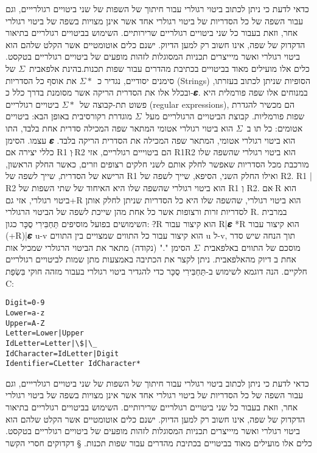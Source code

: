 {כדאי לדעת כי ניתן לכתוב ביטוי רגולרי עבור חיתוך של השפות של שני ביטויים
רגולרייים, וגם עבור השפה של כל הסדריות של ביטוי רגולרי אחד אשר אינן מצויות בשפה
של ביטוי רגולרי אחר, וזאת בעבור כל שני ביטויים רגולריים שרירותיים. השימוש
בביטויים רגולריים בתיאור הדקדוק של שפה, אינו חשוב רק למען הדיוק. ישנם כלים
אוטומטיים אשר הקלט שלהם הוא ביטוי רגולרי ואשר מיייצרים תכניות המסוגלות לזהות
מופעים של ביטויים רגולריים בטקסט. כלים אלו מועילים מאוד בביטויים בכתיבת מהדרים
עבור שפות תכנות.בהינת אלפאבית~$Σ$ של סימנים יסודיים, נגדיר כ~$Σ*$ את אוסף כל הסדריות (Strings) הסופיות שניתן לכתוב בעזרתו, ובכלל אלו את הסדרית הריקה אשר מסומנת בדרך כלל כ-𝜺. במנוחים אלו שפה פורמלית היא פשוט תת-קבוצה של~$Σ*$ ביטויים רגולריים (regular expressions), הם מכשיר להגדרת שפות פורמליות.
קבוצת הביטויים הרגולריים מעל~$Σ$ מוגדרת רקורסיבית באופן הבא:
ביטויים אטומים:
כל תו ב~$Σ$ הוא ביטוי רגולרי אטומי המתאר שפה המכילה סדרית אחת בלבד, התו עצמו.
הסימן 𝜺 הוא ביטוי רגולרי אטומי, המתאר שפה המכילה את הסדרית הריקה בלבד.
כללי יצירה
אם R1 וְ ּR2 הם ביטוייים רגולריים, אזי
R1R2 הוא ביטוי רגולרי שהשפה שלו מורכבת מכל הסדריות שאפשר לחלק אותם לשני חלקים
רצופים וזרים, כאשר החלק הראשון, הרישא של הסדרית, שייך לשפה של R1 ואילו החלק
השני, הסיפא, שייך לשפה של R2. R1 | R2 הוא ביטוי רגולרי שהשפה שלו היא האיחוד של
שתי השפות של R1 וְ R2. אם ּR הוא ביטוי רגולרי, אזי גם+R הוא ביטוי רגולרי, שהשפה
שלו היא כל הסדריות שניתן לחלק אותן לסדריות זרות ורצופות אשר כל אחת מהן שייכת
לשפה של הביטוי הרגולרי R.
במרבית השימושים בפועל מוסיפים תַּחְבִּירִי סֻכָּר כגון:
?ּR הוא קיצור עבור R|𝜺 *R הוא קיצור עבור (+R)|𝜺
u-v הוא קיצור עבור כל התווים שמצויים בין התווים u ל-v, תוך הנחה שיש סדר מוסכם
של התווים באלפאבית~$Σ$ הסימן "." (נקודה) מתאר את הביטוי הרגולרי שמכיל אות אחת
ב
דיוק מהאלפאבית.
ניתן לקצר את הכתיבה באמצעות מתן שמות לביטויים רגולריים חלקיים.
הנה דוגמא לשימוש ב-תַּחְבִּירִי סֻכָּר כדי להגדיר ביטוי רגולרי בעבור מזהה חוקי בִּשְׂפַת C:
\begin{verbatim}
Digit=0-9
Lower=a-z
Upper=A-Z
Letter=Lower|Upper
IdLetter=Letter|\$|\_
IdCharacter=IdLetter|Digit
Identifier=CLetter IdCharacter*
\end{verbatim}

כדאי לדעת כי ניתן לכתוב ביטוי רגולרי עבור חיתוך של השפות של שני ביטויים
רגולרייים, וגם עבור השפה של כל הסדריות של ביטוי רגולרי אחד אשר אינן מצויות בשפה
של ביטוי רגולרי אחר, וזאת בעבור כל שני ביטויים רגולריים שרירותיים. השימוש
בביטויים רגולריים בתיאור הדקדוק של שפה, אינו חשוב רק למען הדיוק. ישנם כלים
אוטומטיים אשר הקלט שלהם הוא ביטוי רגולרי ואשר מיייצרים תכניות המסוגלות לזהות
מופעים של ביטויים רגולריים בטקסט. כלים אלו מועילים מאוד בביטויים בכתיבת מהדרים
עבור שפות תכנות.
§ דקדוקים חסרי הקשר

}
